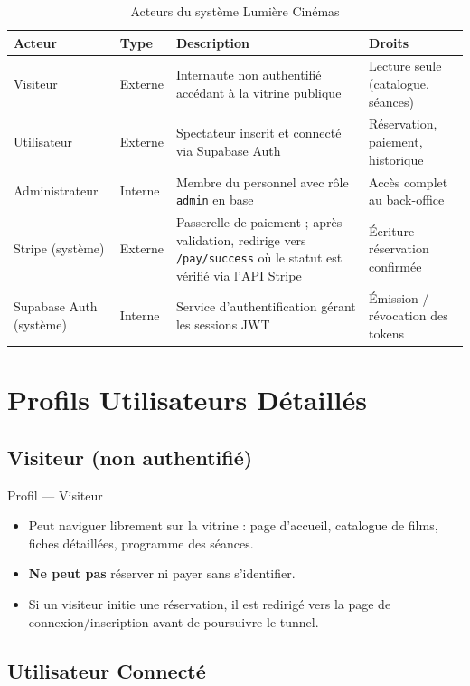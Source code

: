 \documentclass[12pt,a4paper,openany]{report}
\begin{document}
\begin{table}[H]
\centering
\begin{tabularx}{\textwidth}{llXX}
\toprule
\textbf{Acteur} & \textbf{Type} & \textbf{Description} & \textbf{Droits} \\
\midrule
Visiteur & Externe & Internaute non authentifié accédant à la vitrine publique & Lecture seule (catalogue, séances) \\
Utilisateur & Externe & Spectateur inscrit et connecté via Supabase Auth & Réservation, paiement, historique \\
Administrateur & Interne & Membre du personnel avec rôle \texttt{admin} en base & Accès complet au back-office \\
Stripe (système) & Externe & Passerelle de paiement ; après validation, redirige vers \texttt{/pay/success} où le statut est vérifié via l'API Stripe & Écriture réservation confirmée \\
Supabase Auth (système) & Interne & Service d'authentification gérant les sessions JWT & Émission / révocation des tokens \\
\bottomrule
\end{tabularx}
\caption{Acteurs du système Lumière Cinémas}
\end{table}

\section{Profils Utilisateurs Détaillés}

\subsection{Visiteur (non authentifié)}

\begin{reqbox}{Profil — Visiteur}
\begin{itemize}[noitemsep]
  \item Peut naviguer librement sur la vitrine : page d'accueil, catalogue de films, fiches détaillées, programme des séances.
  \item \textbf{Ne peut pas} réserver ni payer sans s'identifier.
  \item Si un visiteur initie une réservation, il est redirigé vers la page de connexion/inscription avant de poursuivre le tunnel.
\end{itemize}
\end{reqbox}

\subsection{Utilisateur Connecté}
\end{document}

